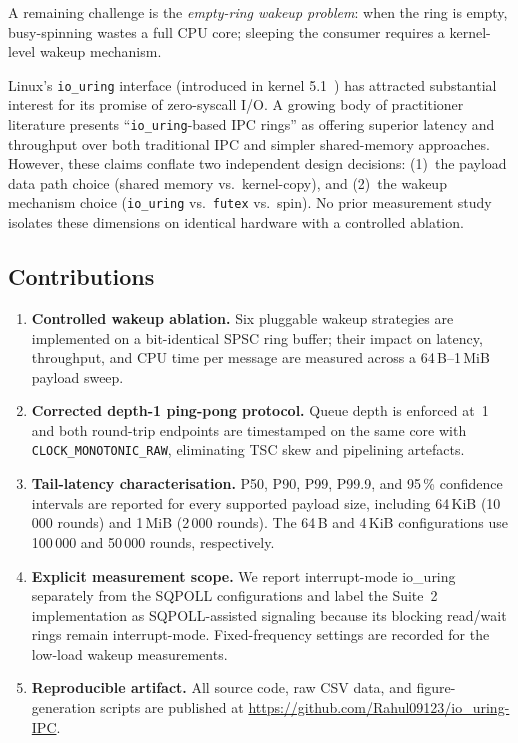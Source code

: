 \documentclass[10pt,conference]{IEEEtran}
\begin{document}
A remaining challenge is the \emph{empty-ring wakeup problem}: when the ring is
empty, busy-spinning wastes a full CPU core; sleeping the consumer requires a
kernel-level wakeup mechanism.

Linux's \texttt{io\_uring} interface (introduced in kernel 5.1~\cite{axboe2019})
has attracted substantial interest for its promise of zero-syscall I/O.  A
growing body of practitioner literature presents ``\texttt{io\_uring}-based IPC
rings'' as offering superior latency and throughput over both traditional IPC
and simpler shared-memory approaches.  However, these claims conflate two
independent design decisions: (1)~the payload data path choice (shared memory
vs.\ kernel-copy), and (2)~the wakeup mechanism choice (\texttt{io\_uring}
vs.\ \texttt{futex} vs.\ spin).  No prior measurement study isolates these
dimensions on identical hardware with a controlled ablation.

\subsection*{Contributions}

\begin{enumerate}
  \item \textbf{Controlled wakeup ablation.}  Six pluggable wakeup strategies
        are implemented on a bit-identical SPSC ring buffer; their impact on
        latency, throughput, and CPU time per message are measured
        across a 64\,B--1\,MiB payload sweep.

  \item \textbf{Corrected depth-1 ping-pong protocol.}  Queue depth is
        enforced at~1 and both round-trip endpoints are timestamped on the
        same core with \texttt{CLOCK\_MONOTONIC\_RAW}, eliminating TSC skew
        and pipelining artefacts.

  \item \textbf{Tail-latency characterisation.}  P50, P90, P99, P99.9, and
        95\,\% confidence intervals are reported for every supported payload
        size, including 64\,KiB (10\,000 rounds) and 1\,MiB (2\,000 rounds).
        The 64\,B and 4\,KiB configurations use 100\,000 and 50\,000 rounds,
        respectively.

  \item \textbf{Explicit measurement scope.}  We report interrupt-mode
        io\_uring separately from the SQPOLL configurations and label the
        Suite~2 implementation as SQPOLL-assisted signaling because its
        blocking read/wait rings remain interrupt-mode.  Fixed-frequency
        settings are recorded for the low-load wakeup measurements.

  \item \textbf{Reproducible artifact.}  All source code, raw CSV data, and
        figure-generation scripts are published at
        \url{https://github.com/Rahul09123/io_uring-IPC}.
\end{enumerate}
\end{document}

